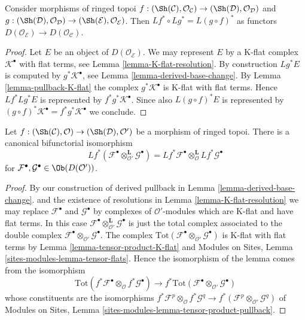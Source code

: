 \begin{lemma}
\label{lemma-derived-pullback-composition}
Consider morphisms of ringed topoi
$f : (\Sh(\mathcal{C}), \mathcal{O}_\mathcal{C}) \to
(\Sh(\mathcal{D}), \mathcal{O}_\mathcal{D})$
and
$g : (\Sh(\mathcal{D}), \mathcal{O}_\mathcal{D}) \to
(\Sh(\mathcal{E}), \mathcal{O}_\mathcal{E})$.
Then $Lf^* \circ Lg^* = L(g \circ f)^*$ as functors
$D(\mathcal{O}_\mathcal{E}) \to D(\mathcal{O}_\mathcal{C})$.
\end{lemma}

\begin{proof}
Let $E$ be an object of $D(\mathcal{O}_\mathcal{E})$.
We may represent $E$ by a K-flat complex $\mathcal{K}^\bullet$
with flat terms, see Lemma \ref{lemma-K-flat-resolution}.
By construction $Lg^*E$ is computed by $g^*\mathcal{K}^\bullet$, see
Lemma \ref{lemma-derived-base-change}.
By Lemma \ref{lemma-pullback-K-flat} the complex
$g^*\mathcal{K}^\bullet$ is K-flat with flat terms.
Hence $Lf^*Lg^*E$ is represented by $f^*g^*\mathcal{K}^\bullet$.
Since also $L(g \circ f)^*E$ is represented by
$(g \circ f)^*\mathcal{K}^\bullet = f^*g^*\mathcal{K}^\bullet$
we conclude.
\end{proof}

\begin{lemma}
\label{lemma-pullback-tensor-product}
Let $f : (\Sh(\mathcal{C}), \mathcal{O}) \to (\Sh(\mathcal{D}), \mathcal{O}')$
be a morphism of ringed topoi.
There is a canonical bifunctorial isomorphism
$$
Lf^*(
\mathcal{F}^\bullet \otimes_{\mathcal{O}'}^{\mathbf{L}} \mathcal{G}^\bullet
) =
Lf^*\mathcal{F}^\bullet 
\otimes_{\mathcal{O}}^{\mathbf{L}}
Lf^*\mathcal{G}^\bullet 
$$
for $\mathcal{F}^\bullet, \mathcal{G}^\bullet \in \Ob(D(\mathcal{O}'))$.
\end{lemma}

\begin{proof}
By our construction of derived pullback in
Lemma \ref{lemma-derived-base-change}.
and the existence of resolutions in
Lemma \ref{lemma-K-flat-resolution}
we may replace $\mathcal{F}^\bullet$ and $\mathcal{G}^\bullet$
by complexes of $\mathcal{O}'$-modules which are K-flat and have
flat terms. In this case
$\mathcal{F}^\bullet \otimes_{\mathcal{O}'}^{\mathbf{L}} \mathcal{G}^\bullet$
is just the total complex associated to the double complex
$\mathcal{F}^\bullet \otimes_{\mathcal{O}'} \mathcal{G}^\bullet$.
The complex
$\text{Tot}(\mathcal{F}^\bullet \otimes_{\mathcal{O}'} \mathcal{G}^\bullet)$
is K-flat with flat terms by Lemma \ref{lemma-tensor-product-K-flat} and
Modules on Sites, Lemma \ref{sites-modules-lemma-tensor-flats}.
Hence the isomorphism of the lemma comes from the isomorphism
$$
\text{Tot}(f^*\mathcal{F}^\bullet \otimes_{\mathcal{O}}
f^*\mathcal{G}^\bullet)
\longrightarrow
f^*\text{Tot}(\mathcal{F}^\bullet \otimes_{\mathcal{O}'} \mathcal{G}^\bullet)
$$
whose constituents are the isomorphisms
$f^*\mathcal{F}^p \otimes_{\mathcal{O}} f^*\mathcal{G}^q \to
f^*(\mathcal{F}^p \otimes_{\mathcal{O}'} \mathcal{G}^q)$ of
Modules on Sites, Lemma \ref{sites-modules-lemma-tensor-product-pullback}.
\end{proof}

